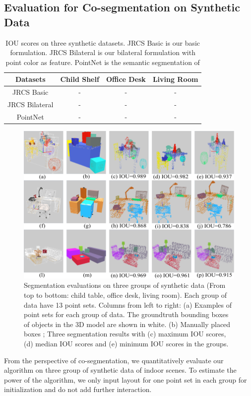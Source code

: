 \subsection{Evaluation for Co-segmentation on Synthetic Data}
\begin{table}
	\centering
	\caption{IOU scores on three synthetic datasets. JRCS Basic is our basic formulation. JRCS Bilateral  is our bilateral formulation with point color as feature. PointNet is the semantic segmentation of \cite{qi2016pointnet} }
	\begin{tabular}{c c c c}
		Datasets & Child Shelf & Office Desk  & Living Room  \\
		\hline
		JRCS Basic & - & - & -\\   
		JRCS Bilateral & - & - & -\\
		PointNet & - & - & -\\
	\end{tabular}
	\label{tab:seg}
\end{table}
\begin{figure}[htb]
	\centering
	\includegraphics[width=0.8\linewidth]{images/seg/seg}
	\caption{\label{fig:seg} Segmentation evaluations on three groups of synthetic data (From top to bottom: child table, office desk, living room). Each group of data have 13 point sets. Columns from left to right: (a) Examples of point sets for each group of data. The groundtruth bounding boxes of objects in the 3D model are shown in white. (b) Manually placed boxes ; Three segmentation results with (c) maximum IOU scores, (d) median IOU scores and (e) minimum IOU scores in the groups.}
\end{figure}
From the perspective of co-segmentation, we quantitatively evaluate our algorithm on three group of synthetic data of indoor scenes. 
%
To estimate the power of the algorithm, we only input layout for one point set in each group for initialization and do not add further interaction.
